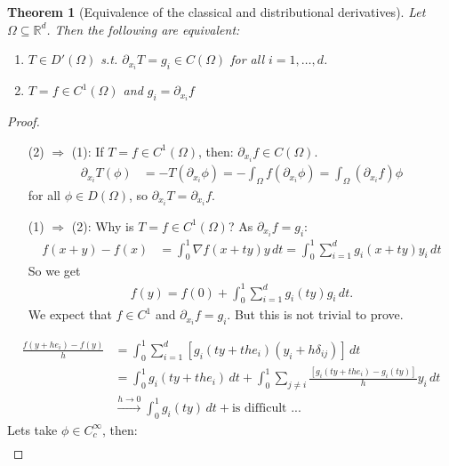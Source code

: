 \documentclass{report}
\theoremstyle{tommy}
\newtheorem{thm}[defn]{Theorem}
\begin{document}
  \begin{thm}[Equivalence of the classical and distributional derivatives]
      Let \(\Omega \subseteq \mathbb{R}^d\). Then the following are equivalent:
      \begin{enumerate}
        \item \(T \in D'(\Omega)\) s.t. \(\partial_{x_i} T = g_i \in C(\Omega)\) for all \(i = 1, \dots, d\).
        \item \(T = f \in C^1(\Omega)\) and \(g_i = \partial_{x_i} f\)
      \end{enumerate}
  \end{thm}

  \begin{proof} \
    \begin{itemize}
      \item [(2) \(\Rightarrow\) (1):] If \(T = f \in C^1(\Omega)\), then: \(\partial_{x_i} f \in C(\Omega)\).
      \begin{align*}
        \partial_{x_i} T(\phi) &= - T(\partial_{x_i} \phi) 
        = - \int_\Omega f(\partial_{x_i} \phi) = \int_\Omega (\partial_{x_i} f) \phi
      \end{align*}
      for all \(\phi \in D(\Omega)\), so \(\partial_{x_i} T = \partial_{x_i} f\).
      \item [(1) \(\Rightarrow\) (2):] Why is \(T = f \in C^1(\Omega)\)? As \(\partial_{x_i} f = g_i\): 
      \begin{align*}
        f(x+y) - f(x) 
        &= \int_0^1 \nabla f(x+ty) y \, dt
        = \int_0^1 \sum_{i=1}^d g_i(x + ty) y_i \, dt
      \end{align*}
      So we get
      \begin{align*}
        f(y) = f(0) + \int_0^1 \sum_{i=1}^d g_i(ty) g_i \, dt.
      \end{align*}
      We expect that \(f \in C^1\) and \(\partial_{x_i} f = g_i\). But this is not trivial to prove.
    \end{itemize}
    \begin{align*}
      \frac{f(y + he_i) - f(y)}{h} 
      &= \int_0^1 \sum_{i=1}^d [g_i(ty + the_i)(y_i + h \delta_{ij})] \, dt \\
      &= \int_0^1 g_i(ty + the_i) \, dt + \int_0^1 \sum_{j \ne i} \frac{[g_i(ty + the_i) - g_i(ty)]}{h} y_i \, dt \\
      &\xrightarrow{h \to 0} \int_0^1 g_i(ty) \, dt  + \text{is difficult ...}
    \end{align*}
    Lets take \(\phi \in C_c^\infty\), then:
    \begin{align*}

\end{align*}
\end{proof}
\end{document}
